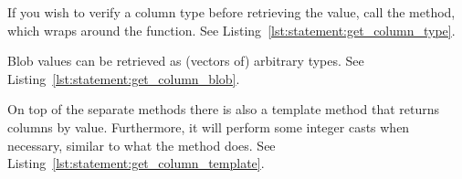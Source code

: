 If you wish to verify a column type before retrieving the value, call the  method, which wraps around the  function. See Listing~\ref{lst:statement:get_column_type}.



Blob values can be retrieved as (vectors of) arbitrary types. See Listing~\ref{lst:statement:get_column_blob}. %



On top of the separate methods there is also a template method that returns columns by value. Furthermore, it will perform some integer casts when necessary, similar to what the  method does. See Listing~\ref{lst:statement:get_column_template}.

